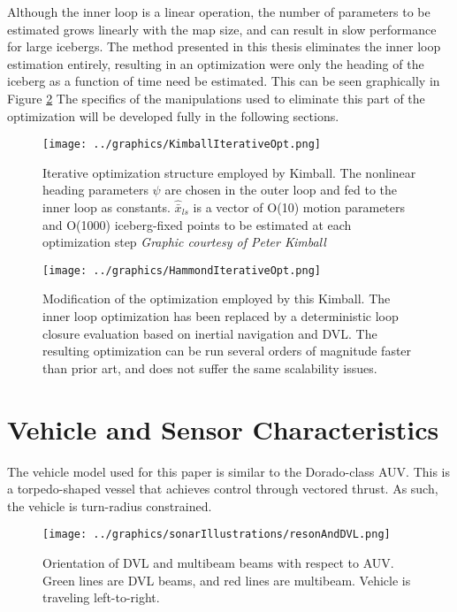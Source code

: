 Although the inner loop is a linear operation, the number of parameters to be estimated grows linearly with the map size, and can result in slow performance for large icebergs. The method presented in this thesis eliminates the inner loop estimation entirely, resulting in an optimization were only the heading of the iceberg as a function of time need be estimated. This can be seen graphically in Figure \ref{fig:NestedLoop2} The specifics of the manipulations used to eliminate this part of the optimization will be developed fully in the following sections. 

\begin{figure}[htbp]
   \centering
   \texttt{[image: ../graphics/KimballIterativeOpt.png]} %
   \caption{Iterative optimization structure employed by Kimball. The nonlinear heading parameters $\psi$ are chosen in the outer loop and fed to the inner loop as constants. $\hat{\bar{x}}_{ls}$ is a vector of O(10) motion parameters and O(1000) iceberg-fixed points to be estimated at each optimization step  \emph{Graphic courtesy of Peter Kimball}}
   \label{fig:NestedLoop}
\end{figure}

\begin{figure}[htbp]
   \centering
   \texttt{[image: ../graphics/HammondIterativeOpt.png]} %
   \caption{Modification of the optimization employed by this Kimball. The inner loop optimization has been replaced by a deterministic loop closure evaluation based on inertial navigation and DVL. The resulting optimization can be run several orders of magnitude faster than prior art, and does not suffer the same scalability issues.}
   \label{fig:NestedLoop2}
\end{figure}

\section{Vehicle and Sensor Characteristics}
\label{sec.VehicleSetup}
The vehicle model used for this paper is similar to the Dorado-class AUV. This is a torpedo-shaped vessel that achieves control through vectored thrust. As such, the vehicle is turn-radius constrained. 

\begin{figure}[htbp]
   \centering
   \texttt{[image: ../graphics/sonarIllustrations/resonAndDVL.png]} %
   \caption{Orientation of DVL and multibeam beams with respect to AUV. Green lines are DVL beams, and red lines are multibeam. Vehicle is traveling left-to-right.}
   \label{fig:DVL}
\end{figure}


